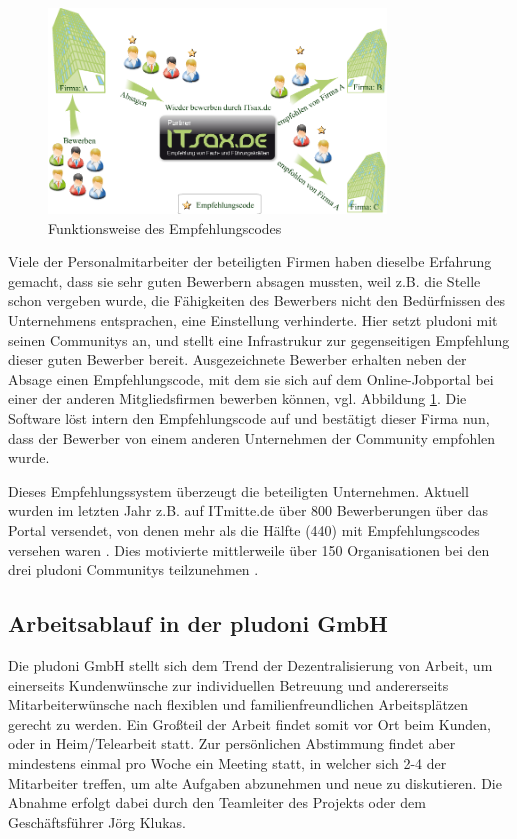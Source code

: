 \begin{figure}[htbp]
 \centering
 \includegraphics[width=0.8\textwidth]{./material/empfehlungscode.png}
 \caption{Funktionsweise des Empfehlungscodes}
 \label{fig:empfehlung}
\end{figure}
Viele der Personalmitarbeiter der beteiligten Firmen haben dieselbe Erfahrung gemacht, dass sie sehr guten Bewerbern absagen mussten, weil z.B. die Stelle schon vergeben wurde, die Fähigkeiten des Bewerbers nicht den Bedürfnissen des Unternehmens entsprachen, eine Einstellung verhinderte. Hier setzt pludoni mit seinen Communitys an, und stellt eine Infrastrukur zur gegenseitigen Empfehlung dieser guten Bewerber bereit.  Ausgezeichnete Bewerber erhalten neben der Absage einen Empfehlungscode, mit dem sie sich auf dem Online-Jobportal bei einer der anderen Mitgliedsfirmen bewerben können, vgl. Abbildung \ref{fig:empfehlung}. Die Software löst intern den Empfehlungscode auf und bestätigt dieser Firma nun, dass der Bewerber von einem anderen Unternehmen der Community empfohlen wurde. 

Dieses Empfehlungssystem überzeugt die beteiligten Unternehmen. Aktuell wurden im letzten Jahr z.B. auf ITmitte.de über 800 Bewerberungen über das Portal versendet, von denen mehr als die Hälfte (440) mit Empfehlungscodes versehen waren \citep{joerg_klukas_startseite_2011}. Dies motivierte mittlerweile über 150 Organisationen bei den drei pludoni Communitys teilzunehmen \citep{joerg_klukas_referenzen_2011}.

\subsection{Arbeitsablauf in der pludoni GmbH}
\label{sec:arbeitsablauf}
Die pludoni GmbH stellt sich dem Trend der Dezentralisierung von Arbeit, um einerseits Kundenwünsche zur individuellen Betreuung und andererseits Mitarbeiterwünsche nach flexiblen und familienfreundlichen Arbeitsplätzen gerecht zu werden. Ein Großteil der Arbeit findet somit vor Ort beim Kunden, oder in Heim/Telearbeit statt.
Zur persönlichen Abstimmung findet aber mindestens einmal pro Woche ein Meeting statt, in welcher sich 2-4 der Mitarbeiter treffen, um alte Aufgaben abzunehmen und neue zu diskutieren. Die Abnahme erfolgt dabei durch den Teamleiter des Projekts oder dem Geschäftsführer Jörg Klukas.

